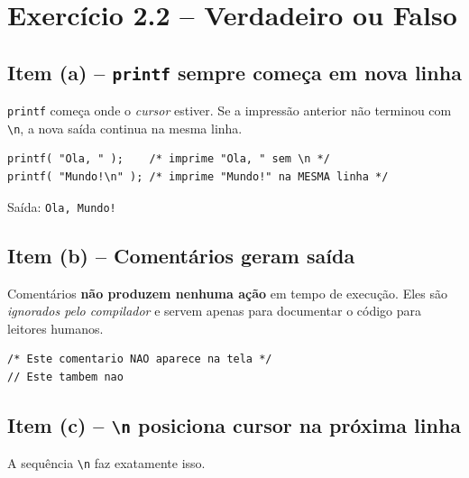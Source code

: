 \documentclass[12pt,a4paper]{article}
\begin{document}
\newpage

\section{Exercício 2.2 -- Verdadeiro ou Falso}

\subsection*{Item (a) -- \texttt{printf} sempre começa em nova linha}
\begin{tcolorbox}[colback=red!5,colframe=deitelred,title={\bfseries FALSO}]
\texttt{printf} começa onde o \textit{cursor} estiver. Se a impressão anterior
não terminou com \texttt{\textbackslash n}, a nova saída continua na mesma linha.

\begin{lstlisting}
printf( "Ola, " );    /* imprime "Ola, " sem \n */
printf( "Mundo!\n" ); /* imprime "Mundo!" na MESMA linha */
\end{lstlisting}
Saída: \texttt{Ola, Mundo!}
\end{tcolorbox}

\subsection*{Item (b) -- Comentários geram saída}
\begin{tcolorbox}[colback=red!5,colframe=deitelred,title={\bfseries FALSO}]
Comentários \textbf{não produzem nenhuma ação} em tempo de execução. Eles são
\textit{ignorados pelo compilador} e servem apenas para documentar o código
para leitores humanos.
\begin{lstlisting}
/* Este comentario NAO aparece na tela */
// Este tambem nao
\end{lstlisting}
\end{tcolorbox}

\subsection*{Item (c) -- \texttt{\textbackslash n} posiciona cursor na próxima linha}
\begin{tcolorbox}[colback=green!5,colframe=deitelgreen,title={\bfseries VERDADEIRO}]
A sequência \texttt{\textbackslash n} faz exatamente isso.
\end{tcolorbox}
\end{document}
